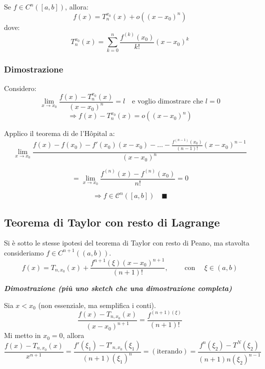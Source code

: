 \documentclass{article}
\theoremstyle{definition}
\begin{document}
Se \( f \in C^n([a, b]) \), allora:
\[
f(x) = T_n^{x_0}(x) + o((x - x_0)^n)
\]
dove:
\[
T_n^{x_0}(x) = \sum_{k = 0}^{n} \frac{f^{(k)}(x_0)}{k!} (x - x_0)^k
\]

\subsubsection*{Dimostrazione}
Considero:
\[
\lim_{x \to x_0} \frac{f(x) - T_n^{x_0}(x)}{(x - x_0)^n} = l \quad \text{e voglio dimostrare che } l = 0
\]
\[
\Rightarrow f(x) - T_n^{x_0}(x) = o((x - x_0)^n)
\]

Applico il teorema di de l'Hôpital a:
\[
\lim_{x \to x_0} \frac{f(x) - f(x_0) - f'(x_0)(x - x_0) - \dots - \frac{f^{(n-1)}(x_0)}{(n-1)!}(x - x_0)^{n-1}}{(x - x_0)^n}
\]

\[
= \lim_{x \to x_0} \frac{f^{(n)}(x) - f^{(n)}(x_0)}{n!} = 0
\]

\[
\Rightarrow f \in \mathcal{C}^n([a, b]) \quad \blacksquare
\]

\newpage
\subsection{Teorema di Taylor con resto di Lagrange}
Si è sotto le stesse ipotesi del teorema di Taylor con resto di Peano, ma stavolta consideriamo $f \in C^{n+1}((a,b))$.
\begin{equation}
    f(x)=T_{n,x_0}(x)+\frac{f^{n+1}(\xi)(x-x_0)^{n+1}}{(n+1)!}, \,\,\,\,\,\,\,\,\,\,\,\,\,\, \mbox{con} \,\,\,\,\,\,\,\, \xi \in (a,b)
\end{equation}

\begin{center}
    \textbf{\textit{Dimostrazione (più uno sketch che una dimostrazione completa)}}
\end{center}
Sia $x<x_0$ (non essenziale, ma semplifica i conti).
\begin{equation}
    \frac{f(x)-T_{n,x_0}(x)}{(x-x_0)^{n+1}}=\frac{f^{(n+1)(\xi)}}{(n+1)!}
\end{equation}
Mi metto in $x_0=0$, allora
\begin{equation}
\frac{f(x)-T_{n,x_0}(x)}{x^{n+1}}=\frac{f'(\xi_1)-T'_{n,x_0}(\xi_1)}{(n+1)(\xi_1)^n}=(\mbox{iterando})=\frac{f^n(\xi_2)-T^N(\xi_2)}{(n+1)n(\xi_2)^{n-1}}
\end{equation}
\end{document}
